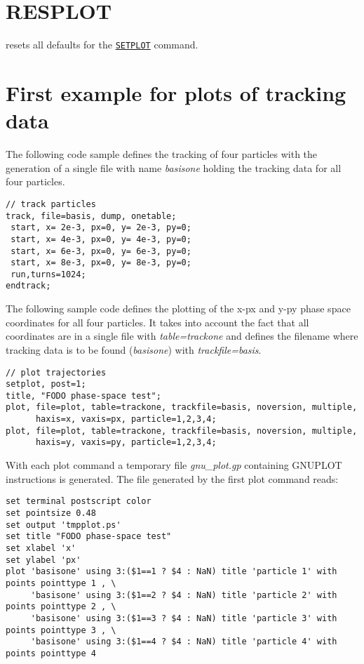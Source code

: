 \section{RESPLOT}
\label{sec:resplot}
resets all defaults for the \hyperref[sec:setplot]{\texttt{SETPLOT}} command.  


\section{First example for plots of tracking data}
\label{sec:plot_example_1}

The following \madx code sample defines the tracking of four particles 
with the generation of a single file with name \textit{basisone} 
holding the tracking data for all four particles.  

\madhline
\begin{verbatim}
// track particles
track, file=basis, dump, onetable;
 start, x= 2e-3, px=0, y= 2e-3, py=0;
 start, x= 4e-3, px=0, y= 4e-3, py=0;
 start, x= 6e-3, px=0, y= 6e-3, py=0;
 start, x= 8e-3, px=0, y= 8e-3, py=0;
 run,turns=1024;
endtrack;
\end{verbatim}
\madhline

The following sample code defines the plotting of the x-px and y-py
phase space coordinates for all four particles. 
It takes into account the fact that all coordinates are in a single file 
with \textit{table=trackone} and defines the filename where tracking data 
is to be found (\textit{basisone}) with \textit{trackfile=basis}. 

\madhline
\begin{verbatim}
// plot trajectories
setplot, post=1; 
title, "FODO phase-space test";
plot, file=plot, table=trackone, trackfile=basis, noversion, multiple, 
      haxis=x, vaxis=px, particle=1,2,3,4; 
plot, file=plot, table=trackone, trackfile=basis, noversion, multiple, 
      haxis=y, vaxis=py, particle=1,2,3,4;
\end{verbatim}
\madhline

With each plot command a temporary file \textit{gnu\_plot.gp} containing
GNUPLOT instructions is generated.  
The file generated by the first plot command reads: 

\madhline
{\footnotesize \begin{verbatim}  
set terminal postscript color
set pointsize 0.48
set output 'tmpplot.ps'
set title "FODO phase-space test"
set xlabel 'x'
set ylabel 'px'
plot 'basisone' using 3:($1==1 ? $4 : NaN) title 'particle 1' with points pointtype 1 , \
     'basisone' using 3:($1==2 ? $4 : NaN) title 'particle 2' with points pointtype 2 , \
     'basisone' using 3:($1==3 ? $4 : NaN) title 'particle 3' with points pointtype 3 , \
     'basisone' using 3:($1==4 ? $4 : NaN) title 'particle 4' with points pointtype 4 
\end{verbatim}}
\madhline
  
